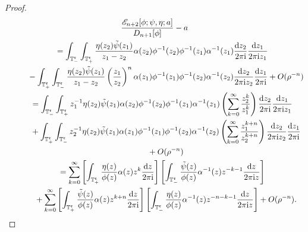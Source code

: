 \documentclass[10pt,a4paper]{amsart}
\numberwithin{equation}{section}
\newcommand{\T}{{\mathbb T}}
\newcommand{\al}{\alpha}
\newcommand{\ii}{{\rm i}}
\newcommand{\dd}{{\rm d}}
\begin{document}
\begin{proof}
			\begin{gather}
					\frac{\mathscr{E}_{n+2}[\phi;\psi, \eta ;a]}{D_{n+1}[\phi]} - a\nonumber\\
\qquad = \int_{\T^{\mathfrak{r}}_{-}} \int_{\T^{\mathfrak{r}}_{+}} \frac{\eta(z_2) \Tilde{\psi}(z_1)}{z_1-z_2} \al(z_2) \phi^{-1}(z_2) \phi^{-1}(z_1) \al^{-1}(z_1) \frac{\dd z_2}{2 \pi \ii } \frac{\dd z_1}{2 \pi \ii z_1}\nonumber \\
\phantom{\qquad =}{} - \int_{\T^{\mathfrak{r}}_{+}} \int_{\T^{\mathfrak{r}}_{-}} \frac{\eta(z_2) \Tilde{\psi}(z_1)}{z_1-z_2} \left( \frac{z_1}{z_2} \right)^n \al(z_1) \phi^{-1}(z_1) \phi^{-1}(z_2) \al^{-1}(z_2) \frac{\dd z_2}{2 \pi \ii z_2} \frac{\dd z_1}{2 \pi \ii } + O(\rho^{-n}) \nonumber\\
\qquad = \int_{\T^{\mathfrak{r}}_{-}} \int_{\T^{\mathfrak{r}}_{+}} z^{-1}_1\eta(z_2) \Tilde{\psi}(z_1) \al(z_2) \phi^{-1}(z_2) \phi^{-1}(z_1) \al^{-1}(z_1) \left( \sum_{k=0}^{\infty} \frac{z^k_2}{z^k_1} \right) \frac{\dd z_2}{2 \pi \ii } \frac{\dd z_1}{2 \pi \ii z_1} \nonumber\\
\phantom{\qquad =}{} + \int_{\T^{\mathfrak{r}}_{+}} \int_{\T^{\mathfrak{r}}_{-}} z^{-1}_2\eta(z_2) \Tilde{\psi}(z_1) \al(z_1) \phi^{-1}(z_1) \phi^{-1}(z_2) \al^{-1}(z_2) \left( \sum_{k=0}^{\infty} \frac{z^{k+n}_1}{z^{k+n}_2} \right) \frac{\dd z_2}{2 \pi \ii z_2} \frac{\dd z_1}{2 \pi \ii }\nonumber \\
\phantom{\qquad =}{} + O(\rho^{-n}) \nonumber\\
\qquad = \sum_{k=0}^{\infty} \left[ \int_{\T^{\mathfrak{r}}_{+}} \frac{\eta(z)}{\phi(z)} \al(z) z^k \frac{\dd z}{2 \pi \ii} \right] \left[ \int_{\T^{\mathfrak{r}}_{-}} \frac{\Tilde{\psi}(z)}{\phi(z)} \al^{-1}(z) z^{-k-1} \frac{\dd z}{2 \pi \ii z} \right] \nonumber\\
\phantom{\qquad =}{} + \sum_{k=0}^{\infty} \left[ \int_{\T^{\mathfrak{r}}_{+}} \frac{\Tilde{\psi}(z)}{\phi(z)} \al(z) z^{k+n} \frac{\dd z}{2 \pi \ii} \right] \left[ \int_{\T^{\mathfrak{r}}_{-}} \frac{\eta(z)}{\phi(z)} \al^{-1}(z) z^{-n-k-1} \frac{\dd z}{2 \pi \ii z} \right] + O(\rho^{-n}).\label{3.61 a}
			\end{gather}
			

\end{proof}
\end{document}
